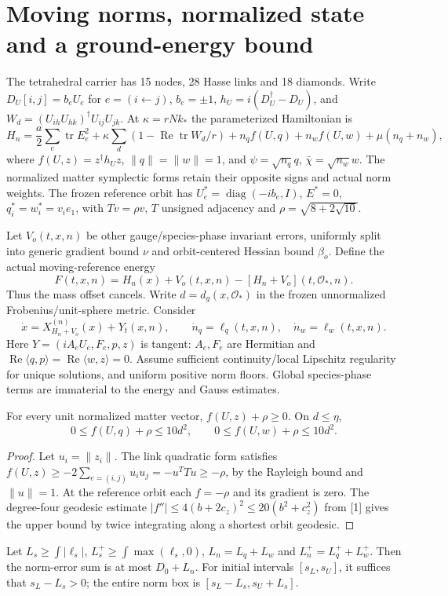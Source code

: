 \documentclass[11pt,a4paper]{article}
\newcommand{\tr}{\operatorname{tr}}\newcommand{\Rea}{\operatorname{Re}}\newcommand{\Om}{\mathcal O_*}\newcommand{\F}{\mathrm F}
\begin{document}
\section{Moving norms, normalized state and a ground-energy bound}
The tetrahedral carrier has 15 nodes, 28 Hasse links and 18 diamonds. Write $D_U[i,j]=b_eU_e$ for $e=(i\leftarrow j)$, $b_e=\pm1$, $h_U=i(D_U^\dagger-D_U)$, and $W_d=(U_{ih}U_{hk})^\dagger U_{ij}U_{jk}$. At $\kappa=rNk_*$ the parameterized Hamiltonian is
\[
H_n=\frac a2\sum_e\tr E_e^2+\kappa\sum_d(1-\Rea\tr W_d/r)
+n_q f(U,q)+n_w f(U,w)+\mu(n_q+n_w),
\]
where $f(U,z)=z^\dagger h_Uz$, $\|q\|=\|w\|=1$, and $\psi=\sqrt{n_q}q$, $\bar\chi=\sqrt{n_w}w$. The normalized matter symplectic forms retain their opposite signs and actual norm weights. The frozen reference orbit has $U_e^*=\operatorname{diag}(-ib_e,I)$, $E^*=0$, $q_i^*=w_i^*=v_ie_1$, with $Tv=\rho v$, $T$ unsigned adjacency and $\rho=\sqrt{8+2\sqrt{10}}$.

Let $V_o(t,x,n)$ be other gauge/species-phase invariant errors, uniformly split into generic gradient bound $\nu$ and orbit-centered Hessian bound $\beta_o$. Define the actual moving-reference energy
\[
F(t,x,n)=H_n(x)+V_o(t,x,n)-[H_n+V_o](t,\Om,n).
\]
Thus the mass offset cancels. Write $d=d_g(x,\Om)$ in the frozen unnormalized Frobenius/unit-sphere metric. Consider
\[
\dot x=X_{H_n+V_o}^{(n)}(x)+Y_t(x,n),\qquad
\dot n_q=\ell_q(t,x,n),\quad\dot n_w=\ell_w(t,x,n).
\]
Here $Y=(iA_eU_e,F_e,p,z)$ is tangent: $A_e,F_e$ are Hermitian and $\Rea\langle q,p\rangle=\Rea\langle w,z\rangle=0$. Assume sufficient continuity/local Lipschitz regularity for unique solutions, and uniform positive norm floors. Global species-phase terms are immaterial to the energy and Gauss estimates.
\begin{lemma}\label{lem:ground}
For every unit normalized matter vector, $f(U,z)+\rho\ge0$. On $d\le\eta$,
\[
0\le f(U,q)+\rho\le10d^2,\qquad
0\le f(U,w)+\rho\le10d^2.
\]
\end{lemma}
\begin{proof}
Let $u_i=\|z_i\|$. The link quadratic form satisfies
$f(U,z)\ge-2\sum_{e=(i,j)}u_i u_j=-u^TTu\ge-\rho$, by the Rayleigh bound and $\|u\|=1$. At the reference orbit each $f=-\rho$ and its gradient is zero. The degree-four geodesic estimate $|f''|\le4(b+2c_z)^2\le20(b^2+c_z^2)$ from [1] gives the upper bound by twice integrating along a shortest orbit geodesic.
\end{proof}
Let $L_s\ge\int|\ell_s|$, $L_s^+\ge\int\max(\ell_s,0)$, $L_n=L_q+L_w$ and $L_n^+=L_q^++L_w^+$. Then the norm-error sum is at most $D_0+L_n$. For initial intervals $[s_L,s_U]$, it suffices that $s_L-L_s>0$; the entire norm box is $[s_L-L_s,s_U+L_s]$.
\newpage
\end{document}

